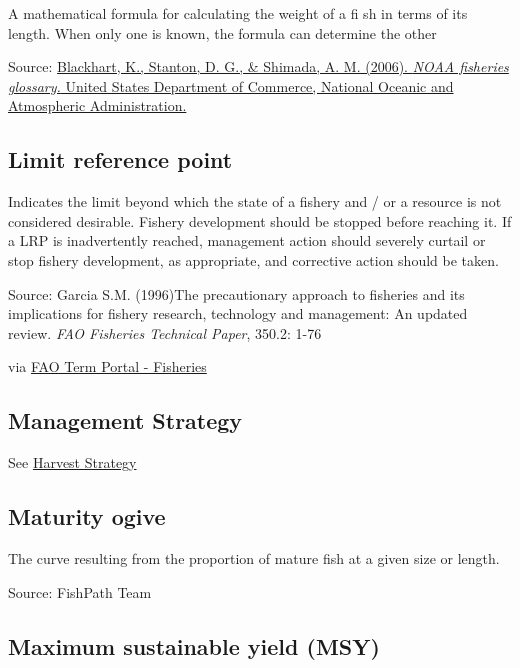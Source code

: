 \documentclass[
  11pt,
]{book}
\begin{document}
A mathematical formula for calculating the weight of a ﬁ sh in terms of its length. When only one is known, the formula can determine the other

Source: \href{https://repository.library.noaa.gov/view/noaa/12856}{Blackhart, K., Stanton, D. G., \& Shimada, A. M. (2006). \emph{NOAA fisheries glossary.} United States Department of Commerce, National Oceanic and Atmospheric Administration.}

\hypertarget{limit-reference-point}{%
\subsection{Limit reference point}\label{limit-reference-point}}

Indicates the limit beyond which the state of a fishery and / or a resource is not considered desirable. Fishery development should be stopped before reaching it. If a LRP is inadvertently reached, management action should severely curtail or stop fishery development, as appropriate, and corrective action should be taken.

Source: Garcia S.M. (1996)The precautionary approach to fisheries and its implications for fishery research, technology and management: An updated review. \emph{FAO Fisheries Technical Paper}, 350.2: 1-76

via \href{http://www.fao.org/fishery/glossary/en}{FAO Term Portal - Fisheries}

\hypertarget{management-strategy}{%
\subsection{Management Strategy}\label{management-strategy}}

See \protect\hyperlink{harvest-strategy}{Harvest Strategy}

\hypertarget{maturity-ogive}{%
\subsection{Maturity ogive}\label{maturity-ogive}}

The curve resulting from the proportion of mature fish at a given size or length.

Source: FishPath Team

\hypertarget{maximum-sustainable-yield-msy}{%
\subsection{Maximum sustainable yield (MSY)}\label{maximum-sustainable-yield-msy}}
\end{document}

